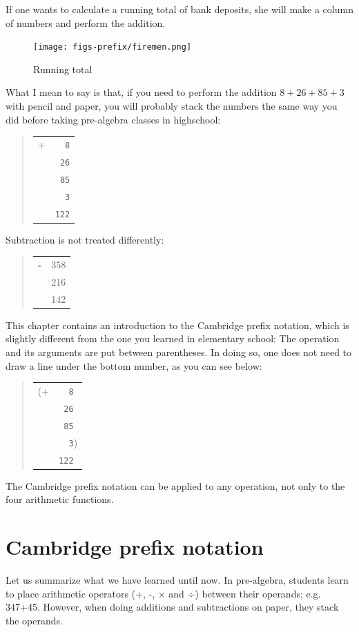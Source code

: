 \documentclass[a4paper,12pt]{book}
\begin{document}
If one wants to calculate a running
total of bank deposits, she will make
a column of numbers and perform the
addition.

\begin{figure}
\renewcommand\figurename{Fig.}
\texttt{[image: figs-prefix/firemen.png]}
\caption{Running total}
\end{figure}
What I mean to say is that, if you
need to perform the addition
$8 + 26 + 85 + 3$ with pencil and paper,
you will probably stack the numbers the
same way you did before taking pre-algebra
classes in highschool:
\begin{quote}
\begin{tabular}{p{0.5cm}p{1cm}}
+ &\verb|  8|\\
&\verb| 26|\\
&\verb| 85|\\
&\verb|  3|\\
\hline
&\verb|122|
\end{tabular}
\end{quote}
Subtraction is not treated differently:
\begin{quote}
\begin{tabular}{p{0.5cm}p{1.5cm}}
\Large\bf -&   358\\
&   216\\
\hline
& 142
\end{tabular}
\end{quote}

This chapter contains an introduction to
the Cambridge prefix notation, 
which is slightly different from the one you
learned in elementary school: The operation
and its arguments are put between parentheses.
In doing so, one does not need to draw a line
under the bottom number, as you can see below:
\begin{quote}
\begin{tabular}{p{0.5cm}p{1cm}}
(+ &\verb|  8|\\
&\verb| 26|\\
&\verb| 85|\\
&\verb|  3|)\\
&\verb|122|
\end{tabular}
\end{quote}
The Cambridge prefix notation can be applied
to any operation, not only to the four arithmetic
functions. 

\section{Cambridge prefix notation}
Let us summarize what we have learned
until now. In pre-algebra, students
learn to place arithmetic operators (+, -, × and ÷)
between their operands; e.g. 347+45.
However, when doing additions and subtractions
on paper, they stack the operands.
\end{document}
